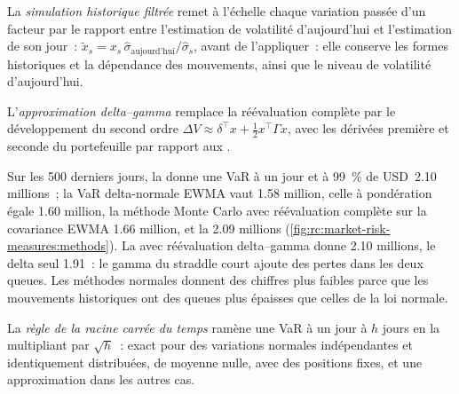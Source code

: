 \begin{definition}\label{def:rc:market-risk-measures:fhs}
La \emph{simulation historique filtrée} remet à l'échelle chaque variation passée
d'un facteur par le rapport entre l'estimation de volatilité d'aujourd'hui et l'estimation de son
jour~: $\tilde x_s = x_s\,\hat\sigma_{\text{aujourd'hui}}/\hat\sigma_s$, avant de l'appliquer~: elle conserve les formes historiques
et la dépendance des mouvements, ainsi que le niveau de volatilité d'aujourd'hui.
\end{definition}

\begin{definition}\label{def:rc:market-risk-measures:dg}
L'\emph{approximation delta--gamma} remplace la réévaluation complète par
le développement du second ordre $\Delta V\approx\delta^\top x+\tfrac12x^\top\Gamma x$, avec les dérivées
première et seconde du portefeuille par rapport aux .
\end{definition}

\begin{example}\label{ex:rc:market-risk-measures:methods}
Sur les 500 derniers jours, la  donne une VaR à un jour et à 99~\% de USD~2.10 millions~;
la VaR delta-normale EWMA vaut 1.58 million, celle à pondération égale 1.60 million, la méthode Monte Carlo
avec réévaluation complète sur la covariance EWMA 1.66 million, et la  2.09 millions
(\cref{fig:rc:market-risk-measures:methods}). La  avec réévaluation delta--gamma donne 2.10 millions,
le delta seul 1.91~: le gamma du straddle court ajoute des pertes dans les deux queues.
Les méthodes normales donnent des chiffres plus faibles parce que les mouvements historiques ont des queues plus épaisses
que celles de la loi normale.
\end{example}

\label{lst:rc:market-risk-measures:var}

\begin{definition}\label{def:rc:market-risk-measures:sqrt}
La \emph{règle de la racine carrée du temps} ramène une VaR à un jour à $h$
jours en la multipliant par $\sqrt h$~: exact pour des variations normales indépendantes et identiquement distribuées, de moyenne nulle,
avec des positions fixes, et une approximation dans les autres cas.
\end{definition}

